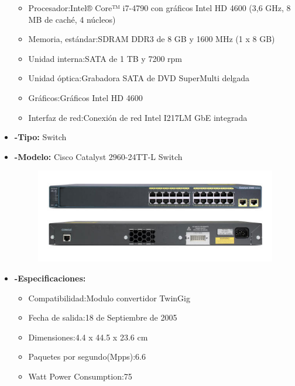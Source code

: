\documentclass{udpreport}
\begin{document}
\begin{itemize}
		\begin{itemize}
			\item Procesador:Intel® Core™ i7-4790 con gráficos Intel HD 4600 (3,6 GHz, 8 MB de caché, 4 núcleos)\\
			\item Memoria, estándar:SDRAM DDR3 de 8 GB y 1600 MHz (1 x 8 GB)\\
			\item Unidad interna:SATA de 1 TB y 7200 rpm\\
			\item Unidad óptica:Grabadora SATA de DVD SuperMulti delgada\\
			\item Gráficos:Gráficos Intel HD 4600\\
			\item Interfaz de red:Conexión de red Intel I217LM GbE integrada\\
		\end{itemize}
		\item{\bf-Tipo:} Switch\\
		\item{\bf-Modelo:} Cisco Catalyst 2960-24TT-L Switch\\
		\begin{figure}[h]
    		\centering
    	\includegraphics[width=\textwidth]{switch.jpg}
		\end{figure}
		\item{\bf-Especificaciones:}
		\begin{itemize}
			\item Compatibilidad:Modulo convertidor TwinGig\\
			\item Fecha de salida:18 de Septiembre de 2005\\
			\item Dimensiones:4.4 x 44.5 x 23.6 cm\\
			\item Paquetes por segundo(Mpps):6.6\\
			\item Watt Power Consumption:75\\

\end{itemize}
\end{itemize}
\end{document}
